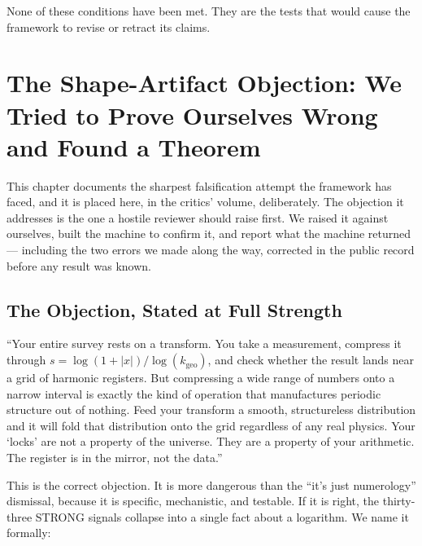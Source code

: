 \documentclass[11pt, letterpaper, openany]{book}
\begin{document}
None of these conditions have been met. They are the tests that
would cause the framework to revise or retract its claims.

\clearpage


\chapter{The Shape-Artifact Objection: We Tried to Prove Ourselves Wrong and Found a Theorem}
\label{ch:shape_artifact}
 
This chapter documents the sharpest falsification attempt the framework has faced,
and it is placed here, in the critics' volume, deliberately. The objection it
addresses is the one a hostile reviewer should raise first. We raised it against
ourselves, built the machine to confirm it, and report what the machine returned ---
including the two errors we made along the way, corrected in the public record before
any result was known.
 
\section{The Objection, Stated at Full Strength}
 
\begin{objectionbox}
``Your entire survey rests on a transform. You take a measurement, compress it through
$s=\log(1+|x|)/\log(k_{\text{geo}})$, and check whether the result lands near a grid of
harmonic registers. But compressing a wide range of numbers onto a narrow interval is
exactly the kind of operation that manufactures periodic structure out of nothing. Feed
your transform a smooth, structureless distribution and it will fold that distribution
onto the grid regardless of any real physics. Your `locks' are not a property of the
universe. They are a property of your arithmetic. The register is in the mirror, not the
data.''
\end{objectionbox}
 
This is the correct objection. It is more dangerous than the ``it's just numerology''
dismissal, because it is specific, mechanistic, and testable. If it is right, the
thirty-three STRONG signals collapse into a single fact about a logarithm. We name it
formally:
 
\end{document}
